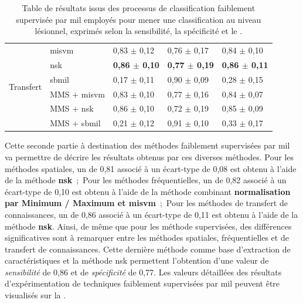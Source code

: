 \begin{table}[H]
\begin{tabular}{cllll}
        \multirow{6}{*}{Transfert}   & \gls{misvm}          & 0,83 $\pm$ 0,12             & 0,76 $\pm$ 0,17             & 0,84 $\pm$ 0,10             \\
                                     & \gls{nsk}            & \textbf{0,86 $\pm$ 0,10}    & \textbf{0,77 $\pm$ 0,19}    & \textbf{0,86 $\pm$ 0,11}    \\
                                     & \gls{sbmil}          & 0,17 $\pm$ 0,11             & 0,90 $\pm$ 0,09             & 0,28 $\pm$ 0,15             \\
                                     & MMS + \gls{misvm}    & 0,83 $\pm$ 0,10             & 0,77 $\pm$ 0,16             & 0,84 $\pm$ 0,07             \\
                                     & MMS + \gls{nsk}      & 0,86 $\pm$ 0,10             & 0,72 $\pm$ 0,19             & 0,85 $\pm$ 0,09             \\
                                     & MMS + \gls{sbmil}    & 0,21 $\pm$ 0,12             & 0,91 $\pm$ 0,10             & 0,33 $\pm$ 0,17             \\ \bottomrule
    \end{tabular}
    \caption{Table de résultats issus des processus de classification faiblement supervisée par \gls{mil} employés pour mener une classification au niveau lésionnel, exprimés selon la sensibilité, la spécificité et le \fscore{}.}
    \label{tab:results_lesion_classification_weakly_patient}
\end{table}
\clearpage

Cette seconde partie à destination des méthodes faiblement supervisées par \gls{mil} va permettre de décrire les résultats obtenus par ces diverses méthodes. Pour les méthodes spatiales, un \fscore{} de 0,81 associé à un écart-type de 0,08 est obtenu à l'aide de la méthode \textbf{\gls{nsk}}~;~Pour les méthodes fréquentielles, un \fscore{} de 0,82 associé à un écart-type de 0,10 est obtenu à l'aide de la méthode combinant \textbf{normalisation par Minimum / Maximum et \gls{misvm}}~;~Pour les méthodes de transfert de connaissances, un \fscore{} de 0,86 associé à un écart-type de 0,11 est obtenu à l'aide de la méthode \textbf{\gls{nsk}}. Ainsi, de même que pour les méthode supervisées, des différences significatives sont à remarquer entre les méthodes spatiales, fréquentielles et de transfert de connaissances. Cette dernière méthode comme base d'extraction de caractéristiques et la méthode \gls{nsk} permettent l'obtention d'une valeur de \textit{sensibilité} de 0,86 et de \textit{spécificité} de 0,77. Les valeurs détaillées des résultats d'expérimentation de techniques faiblement supervisées par \gls{mil} peuvent être visualisés sur la .\par

